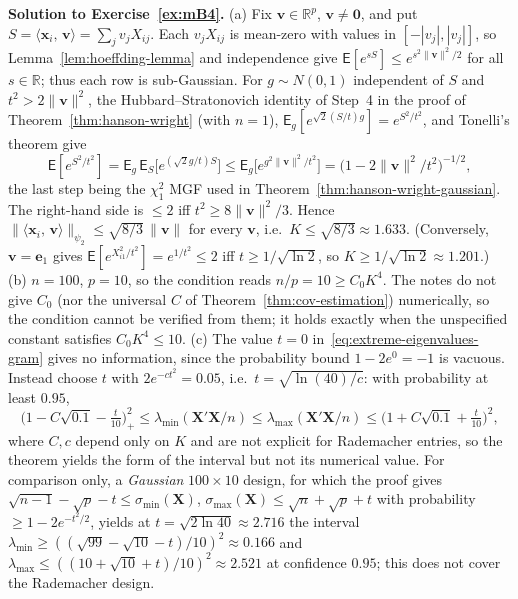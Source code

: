 \documentclass[12pt,a4paper]{article}
\theoremstyle{definition}
\newcommand\expc{\mathsf{E}}
\newcommand{\bX}{\mathbf{X}}
\newcommand{\bx}{\mathbf{x}}
\newcommand{\bzero}{\mathbf{0}}
\newcommand{\bv}{\mathbf{v}}
\newcommand{\Real}{\mathbb{R}}
\newcommand{\ip}[2]{\langle #1,\, #2 \rangle}
\begin{document}
\textbf{Solution to Exercise~\ref{ex:mB4}.} (a) Fix $\bv \in \Real^p$, $\bv \neq \bzero$, and put $S = \ip{\bx_i}{\bv} = \sum_j v_j X_{ij}$. Each $v_jX_{ij}$ is mean-zero with values in $[-|v_j|, |v_j|]$, so Lemma~\ref{lem:hoeffding-lemma} and independence give $\expc[e^{sS}] \leqslant e^{s^2\|\bv\|^2/2}$ for all $s \in \Real$; thus each row is sub-Gaussian. For $g \sim N(0,1)$ independent of $S$ and $t^2 > 2\|\bv\|^2$, the Hubbard--Stratonovich identity of Step~4 in the proof of Theorem~\ref{thm:hanson-wright} (with $n = 1$), $\expc_g[e^{\sqrt{2}(S/t)g}] = e^{S^2/t^2}$, and Tonelli's theorem give
\[
\expc[e^{S^2/t^2}] = \expc_g\,\expc_S\big[e^{(\sqrt{2}g/t)S}\big] \leqslant \expc_g\big[e^{g^2\|\bv\|^2/t^2}\big] = \big(1 - 2\|\bv\|^2/t^2\big)^{-1/2},
\]
the last step being the $\chi^2_1$ MGF used in Theorem~\ref{thm:hanson-wright-gaussian}. The right-hand side is $\leqslant 2$ iff $t^2 \geqslant 8\|\bv\|^2/3$. Hence $\|\ip{\bx_i}{\bv}\|_{\psi_2} \leqslant \sqrt{8/3}\,\|\bv\|$ for every $\bv$, i.e.\ $K \leqslant \sqrt{8/3} \approx 1.633$. (Conversely, $\bv = \mathbf{e}_1$ gives $\expc[e^{X_{i1}^2/t^2}] = e^{1/t^2} \leqslant 2$ iff $t \geqslant 1/\sqrt{\ln 2}$, so $K \geqslant 1/\sqrt{\ln 2} \approx 1.201$.) (b) $n = 100$, $p = 10$, so the condition reads $n/p = 10 \geqslant C_0K^4$. The notes do not give $C_0$ (nor the universal $C$ of Theorem~\ref{thm:cov-estimation}) numerically, so the condition cannot be verified from them; it holds exactly when the unspecified constant satisfies $C_0K^4 \leqslant 10$. (c) The value $t = 0$ in~\eqref{eq:extreme-eigenvalues-gram} gives no information, since the probability bound $1 - 2e^{0} = -1$ is vacuous. Instead choose $t$ with $2e^{-ct^2} = 0.05$, i.e.\ $t = \sqrt{\ln(40)/c}$: with probability at least $0.95$,
\[
\Big(1 - C\sqrt{0.1} - \tfrac{t}{10}\Big)_+^2 \leqslant \lambda_{\min}(\bX'\bX/n) \leqslant \lambda_{\max}(\bX'\bX/n) \leqslant \Big(1 + C\sqrt{0.1} + \tfrac{t}{10}\Big)^2,
\]
where $C, c$ depend only on $K$ and are not explicit for Rademacher entries, so the theorem yields the form of the interval but not its numerical value. For comparison only, a \emph{Gaussian} $100 \times 10$ design, for which the proof gives $\sqrt{n-1} - \sqrt{p} - t \leqslant \sigma_{\min}(\bX)$, $\sigma_{\max}(\bX) \leqslant \sqrt{n} + \sqrt{p} + t$ with probability $\geqslant 1 - 2e^{-t^2/2}$, yields at $t = \sqrt{2\ln 40} \approx 2.716$ the interval $\lambda_{\min} \geqslant ((\sqrt{99} - \sqrt{10} - t)/10)^2 \approx 0.166$ and $\lambda_{\max} \leqslant ((10 + \sqrt{10} + t)/10)^2 \approx 2.521$ at confidence $0.95$; this does not cover the Rademacher design.
\end{document}
